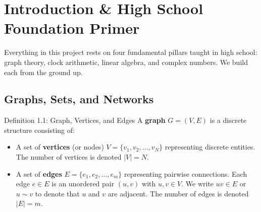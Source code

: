 \documentclass[11pt]{article}
\begin{document}
\begin{abstract}
\noindent
Every number in a worked example was computed by the project's own code and re-derived here by hand. Every claim is labelled by the standard it meets --- proved, proved by exact certificate, proved by interval certification, numerical, conjectural, or refuted --- in Section 16, matching the Status section of the paper.
\end{abstract}


\tableofcontents
\newpage

\section{Introduction \& High School Foundation Primer}

Everything in this project rests on four fundamental pillars taught in high school: graph theory, clock arithmetic, linear algebra, and complex numbers. We build each from the ground up.

\subsection{Graphs, Sets, and Networks}

\begin{defbox}{Definition 1.1: Graph, Vertices, and Edges}
A \textbf{graph} $G = (V, E)$ is a discrete structure consisting of:
\begin{itemize}[leftmargin=*,nosep]
  \item A set of \textbf{vertices} (or nodes) $V = \{v_1, v_2, \dots, v_N\}$ representing discrete entities. The number of vertices is denoted $|V| = N$.
  \item A set of \textbf{edges} $E = \{e_1, e_2, \dots, e_m\}$ representing pairwise connections. Each edge $e \in E$ is an unordered pair $(u, v)$ with $u, v \in V$. We write $uv \in E$ or $u \sim v$ to denote that $u$ and $v$ are adjacent. The number of edges is denoted $|E| = m$.
\end{itemize}
\end{defbox}
\end{document}
